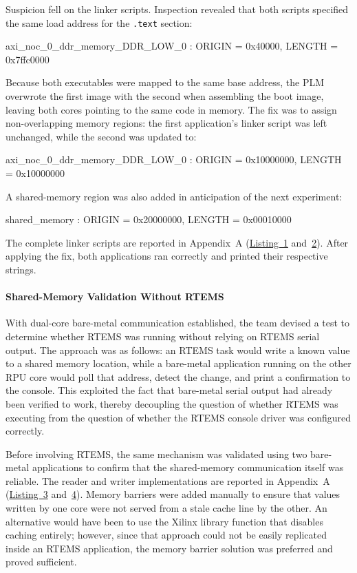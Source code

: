 \documentclass[
	a4paper,
]{CSMakotoTechnicalReport}
\begin{document}
Suspicion fell on the linker scripts.
Inspection revealed that both scripts specified the same load address for the \texttt{.text} section:

\begin{bashcode}
axi_noc_0_ddr_memory_DDR_LOW_0 : ORIGIN = 0x40000, LENGTH = 0x7ffc0000
\end{bashcode}

Because both executables were mapped to the same base address, the PLM overwrote the first image with the second when assembling the boot image, leaving both cores pointing to the same code in memory.
The fix was to assign non-overlapping memory regions: the first application's linker script was left unchanged, while the second was updated to:

\begin{bashcode}
axi_noc_0_ddr_memory_DDR_LOW_0 : ORIGIN = 0x10000000, LENGTH = 0x10000000
\end{bashcode}

A shared-memory region was also added in anticipation of the next experiment:

\begin{bashcode}
shared_memory : ORIGIN = 0x20000000, LENGTH = 0x00010000
\end{bashcode}

The complete linker scripts are reported in Appendix~A (\hyperref[lst:1]{Listing~1} and~\hyperref[lst:2]{2}).
After applying the fix, both applications ran correctly and printed their respective strings.

\paragraph*{Shared-Memory Validation Without RTEMS}

With dual-core bare-metal communication established, the team devised a test to determine whether RTEMS was running without relying on RTEMS serial output.
The approach was as follows: an RTEMS task would write a known value to a shared memory location, while a bare-metal application running on the other RPU core would poll that address, detect the change, and print a confirmation to the console.
This exploited the fact that bare-metal serial output had already been verified to work, thereby decoupling the question of whether RTEMS was executing from the question of whether the RTEMS console driver was configured correctly.

Before involving RTEMS, the same mechanism was validated using two bare-metal applications to confirm that the shared-memory communication itself was reliable.
The reader and writer implementations are reported in Appendix~A (\hyperref[lst:3]{Listing~3} and~\hyperref[lst:4]{4}).
Memory barriers were added manually to ensure that values written by one core were not served from a stale cache line by the other.
An alternative would have been to use the Xilinx library function that disables caching entirely; however, since that approach could not be easily replicated inside an RTEMS application, the memory barrier solution was preferred and proved sufficient.
\end{document}
